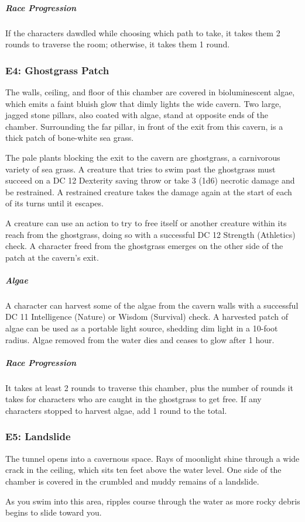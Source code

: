 \documentclass[10pt,a4paper,twoside,fancy,bg=print,twocolumn,openany,nodeprecatedcode]{dndbook}
\begin{document}
\subparagraph{Race Progression}
If the characters dawdled while choosing which path to take, it takes them 2 rounds to traverse the room; otherwise, it takes them 1 round.

\subsubsection{E4: Ghostgrass Patch}
\begin{DndReadAloud}{}
The walls, ceiling, and floor of this chamber are covered in bioluminescent algae, which emits a faint bluish glow that dimly lights the wide cavern. Two large, jagged stone pillars, also coated with algae, stand at opposite ends of the chamber. Surrounding the far pillar, in front of the exit from this cavern, is a thick patch of bone-white sea grass.

\end{DndReadAloud}

The pale plants blocking the exit to the cavern are ghostgrass, a carnivorous variety of sea grass. A creature that tries to swim past the ghostgrass must succeed on a DC 12 Dexterity saving throw or take 3 (1d6) necrotic damage and be restrained. A restrained creature takes the damage again at the start of each of its turns until it escapes.

A creature can use an action to try to free itself or another creature within its reach from the ghostgrass, doing so with a successful DC 12 Strength (Athletics) check. A character freed from the ghostgrass emerges on the other side of the patch at the cavern's exit.

\subparagraph{Algae}
A character can harvest some of the algae from the cavern walls with a successful DC 11 Intelligence (Nature) or Wisdom (Survival) check. A harvested patch of algae can be used as a portable light source, shedding dim light in a 10-foot radius. Algae removed from the water dies and ceases to glow after 1 hour.

\subparagraph{Race Progression}
It takes at least 2 rounds to traverse this chamber, plus the number of rounds it takes for characters who are caught in the ghostgrass to get free. If any characters stopped to harvest algae, add 1 round to the total.

\subsubsection{E5: Landslide}
\begin{DndReadAloud}{}
The tunnel opens into a cavernous space. Rays of moonlight shine through a wide crack in the ceiling, which sits ten feet above the water level. One side of the chamber is covered in the crumbled and muddy remains of a landslide.

As you swim into this area, ripples course through the water as more rocky debris begins to slide toward you.

\end{DndReadAloud}
\end{document}
